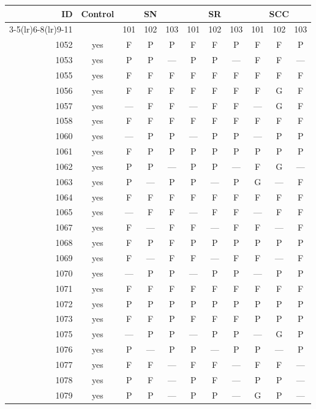 \begin{table}[p]\centering\small
\begin{tabular*}{\textwidth}{@{\extracolsep{\fill}}rc*{9}{c}@{}}\toprule
ID & Control & \multicolumn{3}{c}{SN} & \multicolumn{3}{c}{SR} & \multicolumn{3}{c}{SCC}\\
\cmidrule(lr){3-5}\cmidrule(lr){6-8}\cmidrule(lr){9-11}
 & & 101 & 102 & 103 & 101 & 102 & 103 & 101 & 102 & 103\\\midrule
1052 & yes & F & P & P & F & F & P & F & F & P\\
1053 & yes & P & P & — & P & P & — & F & F & —\\
1055 & yes & F & F & F & F & F & F & F & F & F\\
1056 & yes & F & F & F & F & F & F & F & G & F\\
1057 & yes & — & F & F & — & F & F & — & G & F\\
1058 & yes & F & F & F & F & F & F & F & F & F\\
1060 & yes & — & P & P & — & P & P & — & P & P\\
1061 & yes & F & P & P & P & P & P & P & P & P\\
1062 & yes & P & P & — & P & P & — & F & G & —\\
1063 & yes & P & — & P & P & — & P & G & — & F\\
1064 & yes & F & F & F & F & F & F & F & F & F\\
1065 & yes & — & F & F & — & F & F & — & F & F\\
1067 & yes & F & — & F & F & — & F & F & — & F\\
1068 & yes & F & P & F & P & P & P & P & P & P\\
1069 & yes & F & — & F & F & — & F & F & — & F\\
1070 & yes & — & P & P & — & P & P & — & P & P\\
1071 & yes & F & F & F & F & F & F & F & F & F\\
1072 & yes & P & P & P & P & P & P & P & P & P\\
1073 & yes & F & F & P & F & F & F & P & P & P\\
1075 & yes & — & P & P & — & P & P & — & G & P\\
1076 & yes & P & — & P & P & — & P & P & — & P\\
1077 & yes & F & F & — & F & F & — & F & F & —\\
1078 & yes & P & F & — & P & F & — & P & P & —\\
1079 & yes & P & P & — & P & P & — & G & P & —\\

\end{tabular*}
\end{table}
